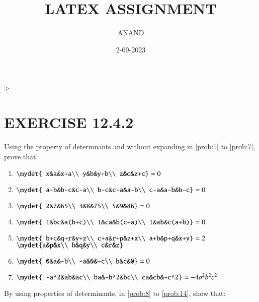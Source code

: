 \documentclass{article}
\theoremstyle{remark}
\begin{document}
\title{LATEX ASSIGNMENT}
\author{ANAND}
\date{2-09-2023}
\maketitle                                                                       >
\section*{EXERCISE 12.4.2}
Using the property of determnants and without expanding in \ref{prob:1} to \ref{prob:7}, prove that
\begin{enumerate}
\item $\mydet{ x&a&x+a\\ y&b&y+b\\ z&c&z+c}=0$ \label{prob:1}
\item $\mydet{ a-b&b-c&c-a\\ b-c&c-a&a-b\\ c-a&a-b&b-c}=0$
\item $\mydet{ 2&7&65\\ 3&8&75\\ 5&9&86}=0$
\item $\mydet{ 1&bc&a(b+c)\\ 1&ca&b(c+a)\\ 1&ab&c(a+b)}=0$
\item $\mydet{ b+c&q+r&y+z\\ c+a&r+p&z+x\\ a+b&p+q&x+y}=2$ $\mydet{a&p&x\\ b&q&y\\ c&r&z}$
\item $\mydet{ 0&a&-b\\ -a&0&-c\\ b&c&0}=0$
\item $\mydet{ -a^2&ab&ac\\ ba&-b^2&bc\\ ca&cb&-c^2} = -4a^2b^2c^2$ \label{prob:7}
\end{enumerate}
By using properties of determinants, in \ref{prob:8} to \ref{prob:14}, show that:
\end{document}

